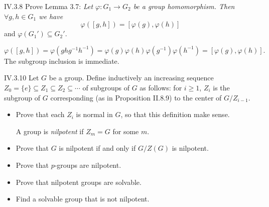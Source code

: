 \begin{problem}{IV.3.8}
Prove Lemma 3.7: \emph{Let $\varphi:G_1 \to G_2$ be a group homomorphism. Then $\forall g,h \in G_1$ we have}
\[
\varphi([g,h]) = [\varphi(g),\varphi(h)]
\]
and $\varphi(G_1') \subseteq G_2'$.
\end{problem}
\begin{pf}
\[
\varphi([g,h]) = \varphi(ghg^{-1}h^{-1}) = \varphi(g)\varphi(h)\varphi(g^{-1})\varphi(h^{-1}) = [\varphi(g), \varphi(h)].	
\]
The subgroup inclusion is immediate.
\end{pf}

\begin{problem}{IV.3.10}
Let $G$ be a group. Define inductively an increasing sequence $Z_0 = \{e\} \subseteq Z_1 \subseteq Z_2 \subseteq \cdots$ of subgroups of $G$ as follows: for $i \geq 1$, $Z_i$ is the subgroup of $G$ corresponding (as in Proposition II.8.9) to the center of $G/Z_{i-1}$.
\begin{itemize}
\setlength\itemsep{0pt}
\item Prove that each $Z_i$ is normal in $G$, so that this definition make sense.

A group is \emph{nilpotent} if $Z_m = G$ for some $m$.
\item Prove that $G$ is nilpotent if and only if $G/Z(G)$ is nilpotent.
\item Prove that $p$-groups are nilpotent.
\item Prove that nilpotent groups are solvable.
\item Find a solvable group that is not nilpotent.
\end{itemize}
\end{problem}
